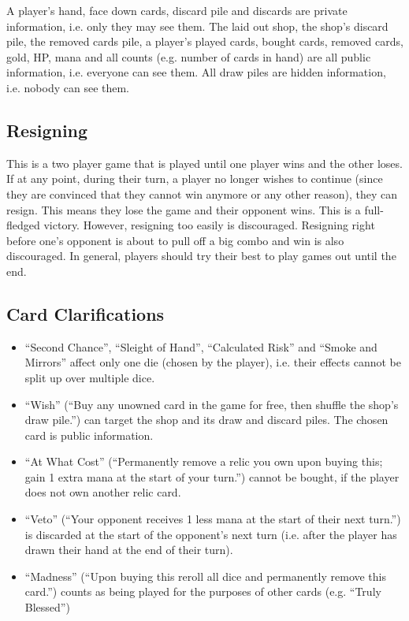 \documentclass[dvipsnames,parskip,a4paper]{scrartcl}
\begin{document}
A player's hand, face down cards, discard pile and discards are private information, i.e. only they may see them. The laid out shop, the shop's discard pile, the removed cards pile, a player's played cards, bought cards, removed cards, gold, HP, mana and all counts (e.g. number of cards in hand) are all public information, i.e. everyone can see them. All draw piles are hidden information, i.e. nobody can see them.

\subsection*{Resigning}

This is a two player game that is played until one player wins and the other loses. If at any point, during their turn, a player no longer wishes to continue (since they are convinced that they cannot win anymore or any other reason), they can resign. This means they lose the game and their opponent wins. This is a full-fledged victory. However, resigning too easily is discouraged. Resigning right before one's opponent is about to pull off a big combo and win is also discouraged. In general, players should try their best to play games out until the end.

\subsection*{Card Clarifications}

\begin{itemize}
\item ``Second Chance'', ``Sleight of Hand'', ``Calculated Risk'' and ``Smoke and Mirrors'' affect only one die (chosen by the player), i.e. their effects cannot be split up over multiple dice.
\item ``Wish'' (``Buy any unowned card in the game for free, then shuffle the shop's draw pile.'') can target the shop and its draw and discard piles. The chosen card is public information.
\item ``At What Cost'' (``Permanently remove a relic you own upon buying this; gain 1 extra mana at the start of your turn.'') cannot be bought, if the player does not own another relic card.
\item ``Veto'' (``Your opponent receives 1 less mana at the start of their next turn.'') is discarded at the start of the opponent's next turn (i.e. after the player has drawn their hand at the end of their turn).
\item ``Madness'' (``Upon buying this reroll all dice and permanently remove this card.'') counts as being played for the purposes of other cards (e.g. ``Truly Blessed'')
\end{itemize}
\end{document}
